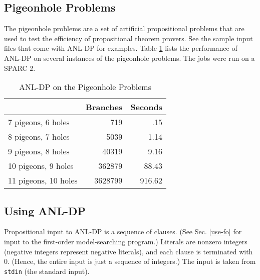 \subsection{Pigeonhole Problems}

The pigeonhole problems are a set of artificial propositional problems
that are used to test the efficiency of propositional theorem provers.
See the sample input files that come with ANL-DP for examples.  Table
\ref{pigeon} lists the performance of ANL-DP on several instances of
the pigeonhole problems.  The jobs were run on a SPARC 2.

\begin{table}[htbp] \centering
\caption{ANL-DP on the Pigeonhole Problems}  \label{pigeon}
\begin{tabular}{lrr} 
 & Branches & Seconds \\
\hline
7 pigeons, 6 holes & 719 & .15 \\
8 pigeons, 7 holes & 5039 & 1.14 \\
9 pigeons, 8 holes & 40319 & 9.16 \\
10 pigeons, 9 holes & 362879 & 88.43 \\
11 pigeons, 10 holes & 3628799 & 916.62 \\
\hline
\end{tabular}
\end{table}

\subsection{Using ANL-DP} \label{use-prop}

Propositional input to ANL-DP is a sequence of clauses.
(See Sec. \ref{use-fo} for input to the first-order model-searching program.)
Literals are nonzero integers (negative integers represent negative
literals), and each clause is terminated with 0.
(Hence, the entire input is just a sequence of integers.)
The input is taken from \verb:stdin: (the standard input).

